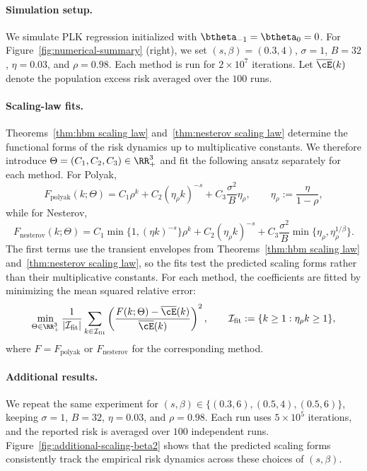 \documentclass[11pt]{article}
\newcommand{\polyak}{\mathrm{polyak}}
\newcommand{\nesterov}{\mathrm{nesterov}}
\begin{document}
\paragraph{Simulation setup.} We simulate PLK regression initialized with \(\btheta_{-1}=\btheta_0=0\). For Figure~\ref{fig:numerical-summary} (right), we set \((s,\beta)=(0.3,4)\), \(\sigma=1\), \(B=32\), \(\eta=0.03\), and \(\rho=0.98\). Each method is run for \(2\times10^7\) iterations. Let \(\overline{\cE}(k)\) denote the population excess risk averaged over the \(100\) runs.

\paragraph{Scaling-law fits.} Theorems~\ref{thm:hbm scaling law} and~\ref{thm:nesterov scaling law} determine the functional forms of the risk dynamics up to multiplicative constants. We therefore introduce \(\Theta=(C_1,C_2,C_3)\in\RR_+^3\) and fit the following ansatz separately for each method. For Polyak,
\[
F_{\polyak}(k;\Theta)=C_1\rho^k+C_2(\eta_\rho k)^{-s}+C_3\frac{\sigma^2}{B}\eta_\rho,\qquad \eta_\rho:=\frac{\eta}{1-\rho},
\]
while for Nesterov,
\[
F_{\nesterov}(k;\Theta)=C_1\min\{1,(\eta k)^{-s}\}\rho^k+C_2(\eta_\rho k)^{-s}+C_3\frac{\sigma^2}{B}\min\{\eta_\rho,\eta_\rho^{1/\beta}\}.
\]
The first terms use the transient envelopes from Theorems~\ref{thm:hbm scaling law} and~\ref{thm:nesterov scaling law}, so the fits test the predicted scaling forms rather than their multiplicative constants. For each method, the coefficients are fitted by minimizing the mean squared relative error:
\[
\min_{\Theta\in\RR_+^3}\frac{1}{|\mathcal I_{\rm fit}|}\sum_{k\in \mathcal I_{\rm fit}}\left(\frac{F(k;\Theta)-\overline{\cE}(k)}{\overline{\cE}(k)}\right)^2,\qquad \mathcal I_{\rm fit}:=\{k\geq1:\eta_\rho k\geq1\},
\]
where \(F=F_{\polyak}\) or \(F_{\nesterov}\) for the corresponding method.

\paragraph{Additional results.} We repeat the same experiment for \((s,\beta)\in\{(0.3,6),(0.5,4),(0.5,6)\}\), keeping \(\sigma=1\), \(B=32\), \(\eta=0.03\), and \(\rho=0.98\). Each run uses \(5\times10^5\) iterations, and the reported risk is averaged over \(100\) independent runs. Figure~\ref{fig:additional-scaling-beta2} shows that the predicted scaling forms consistently track the empirical risk dynamics across these choices of \((s,\beta)\).
\end{document}
